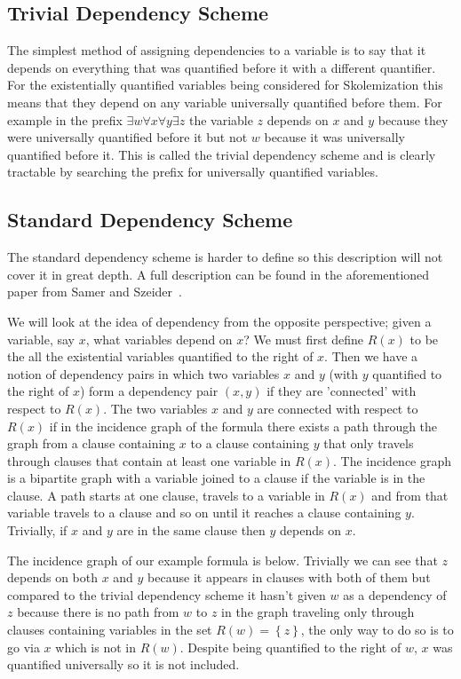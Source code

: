 \subsection{Trivial Dependency Scheme}
The simplest method of assigning dependencies to a variable is to say that it depends on everything that was quantified before it with a different quantifier. For the existentially quantified variables being considered for Skolemization this means that they depend on any variable universally quantified before them. For example in the prefix $\exists w \forall x \forall y \exists z$ the variable $z$ depends on $x$ and $y$ because they were universally quantified before it but not $w$ because it was universally quantified before it. This is called the trivial dependency scheme and is clearly tractable by searching the prefix for universally quantified variables.

\subsection{Standard Dependency Scheme}
The standard dependency scheme is harder to define so this description will not cover it in great depth. A full description can be found in the aforementioned paper from Samer and Szeider~\cite{backdoorsets}.

We will look at the idea of dependency from the opposite perspective; given a variable, say $x$, what variables depend on $x$? We must first define $R(x)$ to be the all the existential variables quantified to the right of $x$. Then we have a notion of dependency pairs in which two variables $x$ and $y$ (with $y$ quantified to the right of $x$) form a dependency pair $(x,y)$ if they are 'connected' with respect to $R(x)$. The two variables $x$ and $y$ are connected with respect to $R(x)$ if in the incidence graph of the formula there exists a path through the graph from a clause containing $x$ to a clause containing $y$ that only travels through clauses that contain at least one variable in $R(x)$. The incidence graph is a bipartite graph with a variable joined to a clause if the variable is in the clause. A path starts at one clause, travels to a variable in $R(x)$ and from that variable travels to a clause and so on until it reaches a clause containing $y$. Trivially, if $x$ and $y$ are in the same clause then $y$ depends on $x$.

The incidence graph of our example formula is below. Trivially we can see that $z$ depends on both $x$ and $y$ because it appears in clauses with both of them but compared to the trivial dependency scheme it hasn't given $w$ as a dependency of $z$ because there is no path from $w$ to $z$ in the graph traveling only through clauses containing variables in the set $R(w)=\left \{z\right \}$, the only way to do so is to go via $x$ which is not in $R(w)$. Despite being quantified to the right of $w$, $x$ was quantified universally so it is not included.

